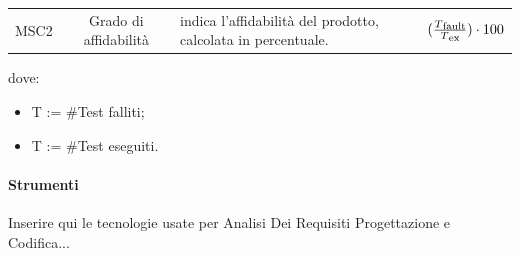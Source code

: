 \begin{itemize}
\begin{table}[H]
\begin{tabular}{ccp{7cm}c}
                  MSC2  &  Grado di affidabilità  &  indica l'affidabilità del prodotto, calcolata in percentuale.  & \Large$(\frac{T\mysubscript{fault}}{T\mysubscript{ex}})\cdot100$ \\    
                  \end{tabular}
            \end{table}
            dove:
            \begin{itemize}
                \item[] T := \#Test falliti;
                \item[] T := \#Test eseguiti.
            \end{itemize}

        \end{itemize}
            
	


        \paragraph{Strumenti}    \label{paragraph:Strumenti}
        Inserire qui le tecnologie usate per Analisi Dei Requisiti Progettazione e Codifica... \\
